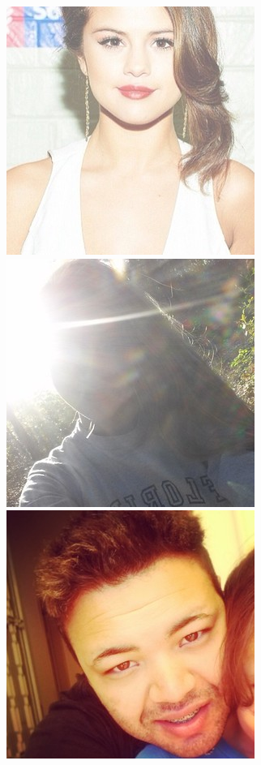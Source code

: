 \begin{figure}[H]
    \subfloat
        {\hspace{1.7cm}\includegraphics[scale = 0.1]{figures/086.jpg}\hspace{0.2cm}}
    \subfloat
        {\includegraphics[scale = 0.1]{figures/098.jpg}\hspace{1.8cm}}
    \subfloat
        {\includegraphics[scale = 0.1]{figures/187.jpg}\hspace{1.6cm}}

\end{figure}
